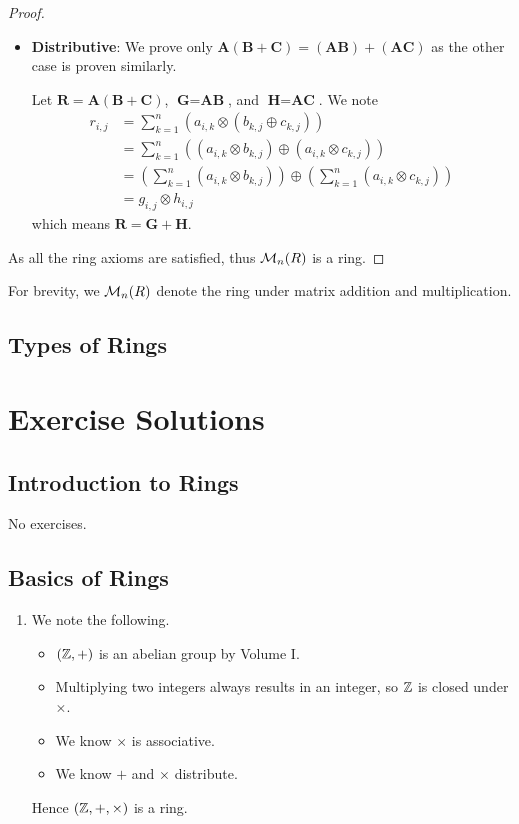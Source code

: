 \begin{proof}
\begin{itemize}
        \item \textbf{Distributive}: We prove only $\textbf{A}(\textbf{B} + \textbf{C}) = (\textbf{AB}) + (\textbf{AC})$ as the other case is proven similarly.
        
        Let $\textbf{R} = \textbf{A}(\textbf{B} + \textbf{C})$, $\textbf{G} = \textbf{AB}$, and $\textbf{H} = \textbf{AC}$. We note
        \begin{align*}
            r_{i,j} &= \sum_{k=1}^n \left(a_{i,k} \otimes \left(b_{k,j} \oplus c_{k,j}\right)\right)\\
            &= \sum_{k=1}^n \left((a_{i,k} \otimes b_{k,j}) \oplus (a_{i,k} \otimes c_{k,j})\right)\\
            &= \left(\sum_{k=1}^n (a_{i,k} \otimes b_{k,j})\right) \oplus \left(\sum_{k=1}^n (a_{i,k} \otimes c_{k,j})\right)\\
            &= g_{i,j}\otimes h_{i,j}
        \end{align*}
        which means $\textbf{R} = \textbf{G} + \textbf{H}$.
    \end{itemize}
    As all the ring axioms are satisfied, thus $\mathcal{M}_{n}(R)$ is a ring.
\end{proof}
For brevity, we $\mathcal{M}_{n}(R)$ denote the ring under matrix addition and multiplication.

\section{Types of Rings}

\appendix
\chapter{Exercise Solutions}
\section{Introduction to Rings}
No exercises.

\section{Basics of Rings}
\begin{enumerate}
    \item We note the following.
    \begin{itemize}
        \item $(\mathbb{Z}, +)$ is an abelian group by Volume I.
        \item Multiplying two integers always results in an integer, so $\mathbb{Z}$ is closed under $\times$.
        \item We know $\times$ is associative.
        \item We know $+$ and $\times$ distribute.
    \end{itemize}
    Hence $(\mathbb{Z}, +, \times)$ is a ring.
\end{enumerate}

